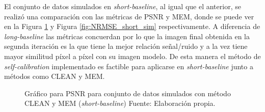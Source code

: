 El conjunto de datos simulados en \textit{short-baseline}, al igual que el anterior, se realizó una comparación con las métricas de PSNR y MEM, donde se puede ver en la Figura \ref{fig:PSNR_short_sim} y Figura \ref{fig:NRMSE_short_sim} respectivamente. A diferencia de \textit{long-baseline} las métricas concuerdan por lo que la imagen final obtenida en la segunda iteración es la que tiene la mejor relación señal/ruido y a la vez tiene mayor similitud píxel a píxel con su imagen modelo. De esta manera el método de \textit{self-calibration} implementado es factible para aplicarse en \textit{short-baseline} junto a métodos como CLEAN y MEM. 

\begin{figure}[!ht]
 \centering
 \caption[Gráfico para PSNR para conjunto de datos simulados con método CLEAN y MEM (\textit{short-baseline})]{Gráfico para PSNR para conjunto de datos simulados con método CLEAN y MEM (\textit{short-baseline}) Fuente: Elaboración propia.}
 \label{fig:PSNR_short_sim}
\end{figure}

